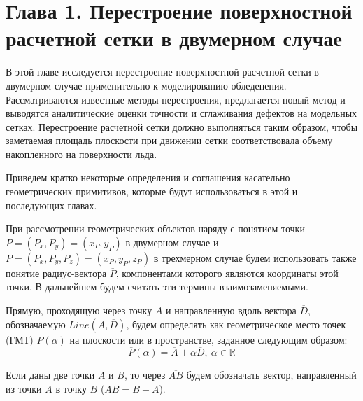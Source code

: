 \newpage
\section*{Глава 1. Перестроение поверхностной расчетной сетки в двумерном случае} %
\addtocounter{section}{1}                                                                             %
\setcounter{subsection}{0}
\setcounter{figure}{0}
\setcounter{equation}{0}
\setcounter{table}{0}
\setcounter{theorem}{0}
\setcounter{lemma}{0}
\setcounter{definition}{0}

В этой главе исследуется перестроение поверхностной расчетной сетки в двумерном случае применительно к моделированию обледенения.
Рассматриваются известные методы перестроения, предлагается новый метод и выводятся аналитические оценки точности и сглаживания дефектов на модельных сетках.
Перестроение расчетной сетки должно выполняться таким образом, чтобы заметаемая площадь плоскости при движении сетки соответствовала объему накопленного на поверхности льда.

Приведем кратко некоторые определения и соглашения касательно геометрических примитивов, которые будут использоваться в этой и последующих главах.

При рассмотрении геометрических объектов наряду с понятием точки $P = (P_x, P_y) = (x_P, y_P)$ в двумерном случае и $P = (P_x, P_y, P_z) = (x_P, y_P, z_P)$ в трехмерном случае будем использовать также понятие радиус-вектора $\overline{P}$, компонентами которого являются координаты этой точки.
В дальнейшем будем считать эти термины взаимозаменяемыми.

Прямую, проходящую через точку $A$ и направленную вдоль вектора $\overline{D}$, обозначаемую $Line(A, \overline{D})$, будем определять как геометрическое место точек (ГМТ\label{abbr:gmt-1}) $\overline{P}(\alpha)$ на плоскости или в пространстве, заданное следующим образом:
\begin{equation}\label{eqn:text_1_geo_prim_line}
	\overline{P}(\alpha) = \overline{A} + \alpha \overline{D}, \ \alpha \in \mathbb{R}
\end{equation}

Если даны две точки $A$ и $B$, то через $\overline{AB}$ будем обозначать вектор, направленный из точки $A$ в точку $B$ ($\overline{AB} = \overline{B} - \overline{A}$).

